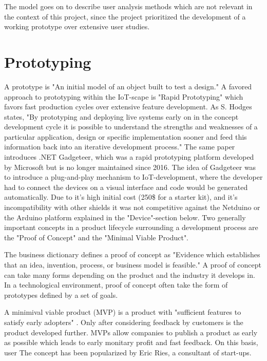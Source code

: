 The model goes on to describe user analysis methods which are not relevant in the context of this project, 
since the project prioritized the development of a working prototype over extensive user studies. 

\section{Prototyping}
A prototype is "An initial model of an object built to test a design." \parencite{prototypeDef}
A favored approach to prototyping within the IoT-scape is "Rapid Prototyping" 
which favors fast production cycles over extensive feature development. 
As S. Hodges states, "By prototyping and deploying live systems early on in the concept development cycle it is possible to understand the strengths and weaknesses of a particular application, design or specific implementation sooner 
and feed this information back into an iterative development process." \parencite{rapidProto3}
The same paper introduces .NET Gadgeteer, which was a rapid prototyping platform developed by Microsoft but is no longer maintained since 2016.
The idea of Gadgeteer was to introduce a plug-and-play mechanism to IoT-development, where the developer had to connect the devices on a visual interface and code would be generated automatically.
Due to it's high initial cost (250\$ for a starter kit), 
and it's incompatibility with other shields it was not competitive against the Netduino or the Arduino platform explained in the "Device"-section below.
Two generally important concepts in a product lifecycle surrounding a development process 
are the "Proof of Concept" and the "Minimal Viable Product".

The business dictionary defines a proof of concept as "Evidence which establishes that an idea, invention, process, or business model is feasible."
\parencite{PoC}
A proof of concept can take many forms depending on the product and the industry it develops in. 
In a technological environment, proof of concept often take the form of prototypes defined by a set of goals.

A minimival viable product (MVP) is a product with "sufficient features to satisfy early adopters" \parencite{mvp}. 
Only after considering feedback by customers is the product developed further. 
MVPs allow companies to publish a product as early as possible which leads to early monitary profit and fast feedback. 
On this basis, user
The concept has been popularized by Eric Ries, a consultant of start-ups.

